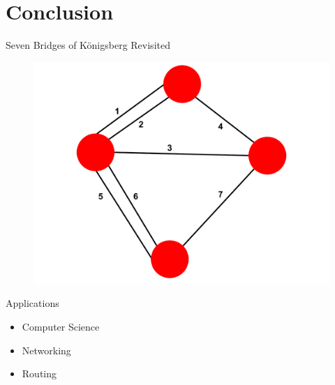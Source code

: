 \documentclass{beamer}
\begin{document}
\section{Conclusion}

\begin{frame}{Seven Bridges of K\"{o}nigsberg Revisited}
	\begin{figure}
		\centering
		\includegraphics[scale=.35]{pictures/konigsberg.pdf}
	\end{figure}
\end{frame}

\begin{frame}{Applications}
	\begin{itemize}
		\item<1-> Computer Science
		\item<2-> Networking
		\item<3-> Routing 
	\end{itemize}
\end{frame}

\end{document}
